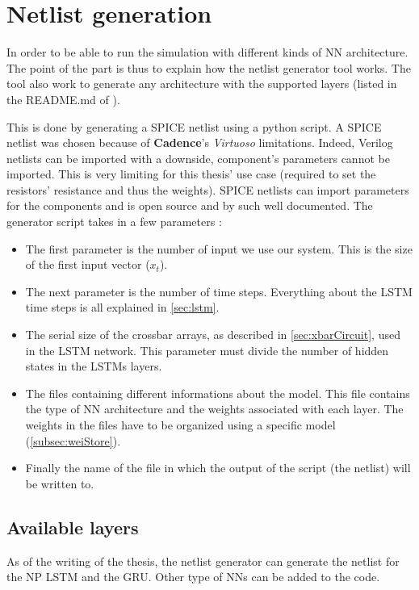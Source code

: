 \section{Netlist generation}
\label{sec:netlist}

In order to be able to run the simulation with different kinds of \ac{NN} architecture. The point of the part is thus to explain how the netlist generator tool works. The tool also work to generate any architecture with the supported layers (listed in the README.md of \cite{lstmGen}).

This is done by generating a SPICE netlist using a python script. A SPICE netlist was chosen because of \textbf{Cadence}'s \textit{Virtuoso} limitations. Indeed, Verilog netlists can be imported with a downside, component's parameters cannot be imported. This is very limiting for this thesis' use case (required to set the resistors' resistance and thus the weights). SPICE netlists can import parameters for the components and is open source and by such well documented. The generator script takes in a few parameters :

\begin{itemize}
  \item The first parameter is the number of input we use our system. This is the size of the first input vector ($x_t$).
  \item The next parameter is the number of time steps. Everything about the \ac{LSTM} time steps is all explained in \cref{sec:lstm}.
  \item The serial size of the crossbar arrays, as described in \cref{sec:xbarCircuit}, used in the \ac{LSTM} network. This parameter must divide the number of hidden states in the \acp{LSTM} layers.
  \item The files containing different informations about the model. This file contains the type of \ac{NN} architecture and the weights associated with each layer. The weights in the files have to be organized using a specific model (\cref{subsec:weiStore}).
  \item Finally the name of the file in which the output of the script (the netlist) will be written to.
\end{itemize}

\subsection{Available layers}

As of the writing of the thesis, the netlist generator can generate the netlist for the \ac{NP} \ac{LSTM} and the \ac{GRU}. Other type of \acp{NN} can be added to the code.

